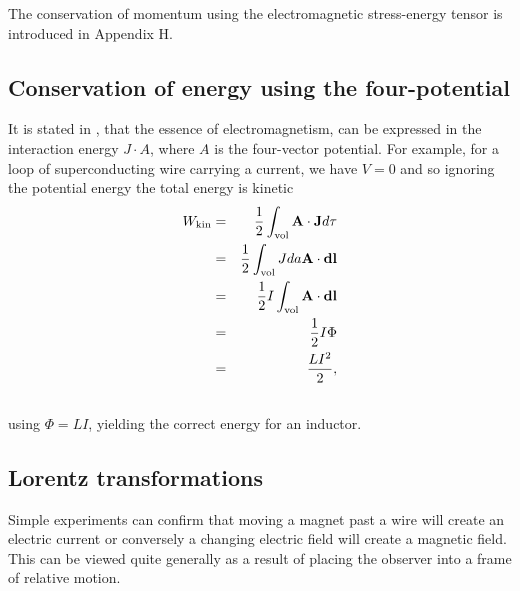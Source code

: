 \documentclass[12pt,aps,prb,preprint]{revtex4}   %
\newcommand{\bea}{\begin{eqnarray}}
\newcommand{\eea}{\end{eqnarray}}
\begin{document}
The conservation of momentum using the electromagnetic stress-energy tensor is introduced in Appendix H.

\subsection{Conservation of energy using the four-potential}

It is stated in \cite{Mead2002}, that the essence of electromagnetism, can be expressed in the interaction energy $ J \cdot A $, where $ A $ is the four-vector potential.
For example, for a loop of superconducting wire carrying a current, we have $ V = 0 $ and so ignoring the potential energy the total energy is kinetic
\bea
W_{\rm{kin}} & = & \frac{1}{2} \int_{\rm{vol}} \mathbf{A} \cdot \mathbf{J} d \tau \\ \nonumber
 & = & \frac{1}{2} \int_{\rm{vol}} J da \mathbf{A} \cdot \mathbf{dl}  \\ \nonumber
 & = & \frac{1}{2} I \int_{\rm{vol}} \mathbf{A} \cdot \mathbf{dl}  \\ \nonumber
 & = & \frac{1}{2} I \Phi  \\ \nonumber
 & = & \frac{L I^2}{2} ,  \\ \nonumber
\eea
using $ \Phi = L I $, yielding the correct energy for an inductor.

\subsection{Lorentz transformations}

Simple experiments can confirm that moving a magnet past a wire will create an electric current or conversely a changing electric field will create a magnetic field.  This can be viewed quite generally as a result of placing the observer into a frame of relative motion.  
\end{document}
